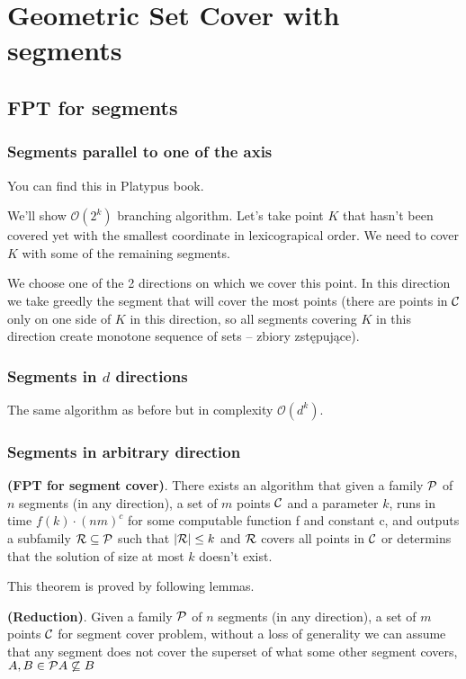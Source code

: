 \chapter{Geometric Set Cover with segments}

\section{FPT for segments}
\subsection{Segments parallel to one of the axis}
You can find this in Platypus book.

We'll show $\mathcal{O}(2^k)$ branching algorithm.
Let's take point $K$ that hasn't been covered yet with
the smallest coordinate in lexicograpical order.
We need to cover $K$ with some of the remaining segments.

We choose one of the 2 directions on which we cover this point.
In this direction we take greedly the segment that will cover
the most points (there are points in $\mathcal{C}$ only on
one side of $K$ in this direction, so all
segments covering $K$ in this direction create monotone sequence
of sets -- zbiory zstępujące).

\subsection{Segments in $d$ directions}
The same algorithm as before but in complexity $\mathcal{O}(d^k)$.

\subsection{Segments in arbitrary direction}
\begin{tw}{
	\label{segment_cover_fpt}
	\textbf{(FPT for segment cover)}.
	There exists an algorithm that given a family $\mathcal{P}$ of
	$n$ segments (in any direction),
	a set of $m$ points $\mathcal{C}$
	and a parameter $k$,
	runs in time $f(k) \cdot (nm)^c$ for some computable function f and constant c,
	and outputs a subfamily $\mathcal{R} \subseteq \mathcal{P}$
	such that $|\mathcal{R}| \le k$ and $\mathcal{R}$ covers all points in $\mathcal{C}$
	or determins that the solution of size at most $k$ doesn't exist.
}\end{tw}

This theorem is proved by following lemmas.

\begin{lemma}
   \label{fpt_reduction}
   \textbf{(Reduction)}.
   Given a family $\mathcal{P}$ of
	$n$ segments (in any direction),
	a set of $m$ points $\mathcal{C}$
	for segment cover problem,
   without a loss of generality we can assume that
   any segment does not cover the superset
   of what some other segment covers, $A, B \in \mathcal{P} A \not \subseteq B$
\end{lemma}   
   
